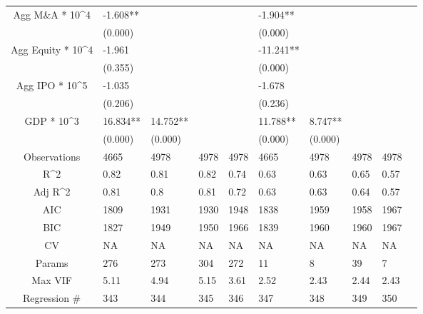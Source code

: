 \documentclass{article}
\begin{document}
\begin{table}[H]
\begin{tabular}{|clllllllll|}
  Agg M\&A * 10^4 & -1.608** &  &  &  & -1.904** &  &  &  & \\ 
   & (0.000) &  &  &  & (0.000) &  &  &  & \\ 
  Agg Equity * 10^4 & -1.961 &  &  &  & -11.241** &  &  &  & \\ 
   & (0.355) &  &  &  & (0.000) &  &  &  & \\ 
  Agg IPO * 10^5 & -1.035 &  &  &  & -1.678 &  &  &  & \\ 
   & (0.206) &  &  &  & (0.236) &  &  &  & \\ 
  GDP * 10^3 & 16.834** & 14.752** &  &  & 11.788** & 8.747** &  &  & \\ 
   & (0.000) & (0.000) &  &  & (0.000) & (0.000) &  &  & \\ 
  \hline 
 Observations & 4665 & 4978 & 4978 & 4978 & 4665 & 4978 & 4978 & 4978 & \\ 
  R^2 & 0.82 & 0.81 & 0.82 & 0.74 & 0.63 & 0.63 & 0.65 & 0.57 & \\ 
  Adj R^2 & 0.81 & 0.8 & 0.81 & 0.72 & 0.63 & 0.63 & 0.64 & 0.57 & \\ 
  AIC & 1809 & 1931 & 1930 & 1948 & 1838 & 1959 & 1958 & 1967 & \\ 
  BIC & 1827 & 1949 & 1950 & 1966 & 1839 & 1960 & 1960 & 1967 & \\ 
  CV & NA & NA & NA & NA & NA & NA & NA & NA & \\ 
  Params & 276 & 273 & 304 & 272 & 11 & 8 & 39 & 7 & \\ 
  Max VIF & 5.11 & 4.94 & 5.15 & 3.61 & 2.52 & 2.43 & 2.44 & 2.43 & \\ 
  Regression \# & 343 & 344 & 345 & 346 & 347 & 348 & 349 & 350 & \\ 
   \hline
\end{tabular}
 
\end{table}
\end{document}
